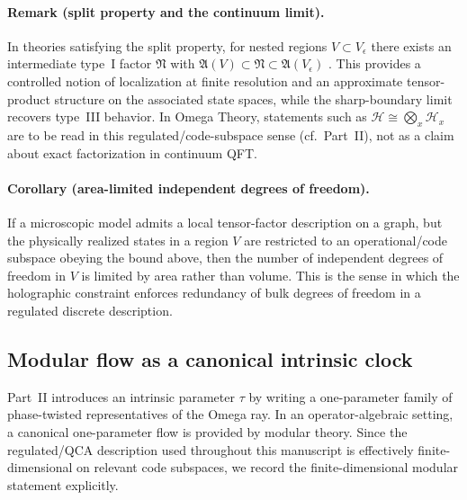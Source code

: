 \paragraph{Remark (split property and the continuum limit).}
In theories satisfying the split property, for nested regions $V\subset V_{\epsilon}$ there exists an intermediate type~I factor $\mathfrak{N}$ with $\mathfrak{A}(V)\subset \mathfrak{N}\subset \mathfrak{A}(V_{\epsilon})$ \cite{Buchholz1987}. This provides a controlled notion of localization at finite resolution and an approximate tensor-product structure on the associated state spaces, while the sharp-boundary limit recovers type~III behavior.
In Omega Theory, statements such as $\mathcal{H}\cong\bigotimes_x\mathcal{H}_x$ are to be read in this regulated/code-subspace sense (cf.\ Part~II), not as a claim about exact factorization in continuum QFT.\par

\paragraph{Corollary (area-limited independent degrees of freedom).}
If a microscopic model admits a local tensor-factor description on a graph, but the physically realized states in a region $V$ are restricted to an operational/code subspace obeying the bound above, then the number of independent degrees of freedom in $V$ is limited by area rather than volume. This is the sense in which the holographic constraint enforces redundancy of bulk degrees of freedom in a regulated discrete description.

\subsection{Modular flow as a canonical intrinsic clock}
\label{app:modular_time}
Part~II introduces an intrinsic parameter $\tau$ by writing a one-parameter family of phase-twisted representatives of the Omega ray. In an operator-algebraic setting, a canonical one-parameter flow is provided by modular theory. Since the regulated/QCA description used throughout this manuscript is effectively finite-dimensional on relevant code subspaces, we record the finite-dimensional modular statement explicitly.


